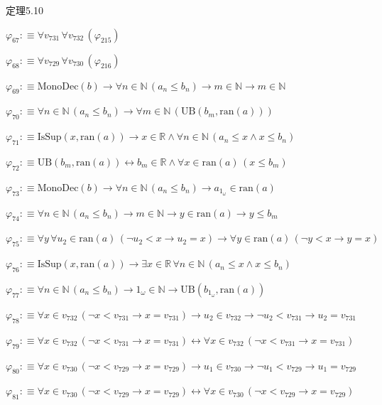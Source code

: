 \begin{fullproof}{定理5.10}
\begin{abbrevlist}
\item $\varphi_{67} :\equiv \forall v_{731}\,\forall v_{732}\,(\varphi_{215})$
\item $\varphi_{68} :\equiv \forall v_{729}\,\forall v_{730}\,(\varphi_{216})$
\item $\varphi_{69} :\equiv \mathrm{MonoDec}(b) \to \forall n \in \mathbb{N}\,(a_{n} \leq b_{n}) \to m \in \mathbb{N} \to m \in \mathbb{N}$
\item $\varphi_{70} :\equiv \forall n \in \mathbb{N}\,(a_{n} \leq b_{n}) \to \forall m \in \mathbb{N}\,(\mathrm{UB}(b_{m},\mathrm{ran}(a)))$
\item $\varphi_{71} :\equiv \mathrm{IsSup}(x,\mathrm{ran}(a)) \to x \in \mathbb{R} \land \forall n \in \mathbb{N}\,(a_{n} \leq x \land x \leq b_{n})$
\item $\varphi_{72} :\equiv \mathrm{UB}(b_{m},\mathrm{ran}(a)) \leftrightarrow b_{m} \in \mathbb{R} \land \forall x \in \mathrm{ran}(a)\,(x \leq b_{m})$
\item $\varphi_{73} :\equiv \mathrm{MonoDec}(b) \to \forall n \in \mathbb{N}\,(a_{n} \leq b_{n}) \to a_{1_{\omega}} \in \mathrm{ran}(a)$
\item $\varphi_{74} :\equiv \forall n \in \mathbb{N}\,(a_{n} \leq b_{n}) \to m \in \mathbb{N} \to y \in \mathrm{ran}(a) \to y \leq b_{m}$
\item $\varphi_{75} :\equiv \forall y\,\forall u_{2} \in \mathrm{ran}(a)\,(\neg u_{2} < x \to u_{2} = x) \to \forall y \in \mathrm{ran}(a)\,(\neg y < x \to y = x)$
\item $\varphi_{76} :\equiv \mathrm{IsSup}(x,\mathrm{ran}(a)) \to \exists x \in \mathbb{R}\,\forall n \in \mathbb{N}\,(a_{n} \leq x \land x \leq b_{n})$
\item $\varphi_{77} :\equiv \forall n \in \mathbb{N}\,(a_{n} \leq b_{n}) \to 1_{\omega} \in \mathbb{N} \to \mathrm{UB}(b_{1_{\omega}},\mathrm{ran}(a))$
\item $\varphi_{78} :\equiv \forall x \in v_{732}\,(\neg x < v_{731} \to x = v_{731}) \to u_{2} \in v_{732} \to \neg u_{2} < v_{731} \to u_{2} = v_{731}$
\item $\varphi_{79} :\equiv \forall x \in v_{732}\,(\neg x < v_{731} \to x = v_{731}) \leftrightarrow \forall x \in v_{732}\,(\neg x < v_{731} \to x = v_{731})$
\item $\varphi_{80} :\equiv \forall x \in v_{730}\,(\neg x < v_{729} \to x = v_{729}) \to u_{1} \in v_{730} \to \neg u_{1} < v_{729} \to u_{1} = v_{729}$
\item $\varphi_{81} :\equiv \forall x \in v_{730}\,(\neg x < v_{729} \to x = v_{729}) \leftrightarrow \forall x \in v_{730}\,(\neg x < v_{729} \to x = v_{729})$

\end{abbrevlist}
\end{fullproof}
